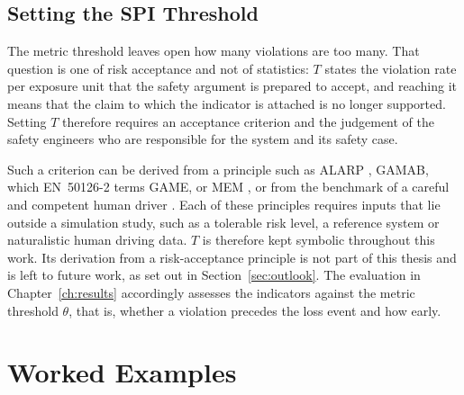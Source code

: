 \subsection{Setting the SPI Threshold}
\label{sec:method_spithreshold}

The metric threshold leaves open how many violations are too many. That question
is one of risk acceptance and not of statistics: $T$ states the violation rate per
exposure unit that the safety argument is prepared to accept, and reaching it
means that the claim to which the indicator is attached is no longer supported.
Setting $T$ therefore requires an acceptance criterion and the judgement of the
safety engineers who are responsible for the system and its safety case.

Such a criterion can be derived from a principle such as ALARP
\cite{hse2001r2p2}, GAMAB, which EN~50126-2 terms GAME, or \ac{MEM} \cite{en50126},
or from the benchmark of a careful and competent human driver
\cite{wang2024sotif} \cite{avsc2023human}. Each of these principles requires
inputs that lie outside a simulation study, such as a tolerable risk level, a
reference system or naturalistic human driving data. $T$ is therefore kept
symbolic throughout this work. Its derivation from a risk-acceptance principle
is not part of this thesis and is left to future work, as set out in
Section~\ref{sec:outlook}. The evaluation in Chapter~\ref{ch:results} accordingly
assesses the indicators against the metric threshold $\theta$, that is, whether a
violation precedes the loss event and how early.

\section{Worked Examples}
\label{sec:method_examples}


